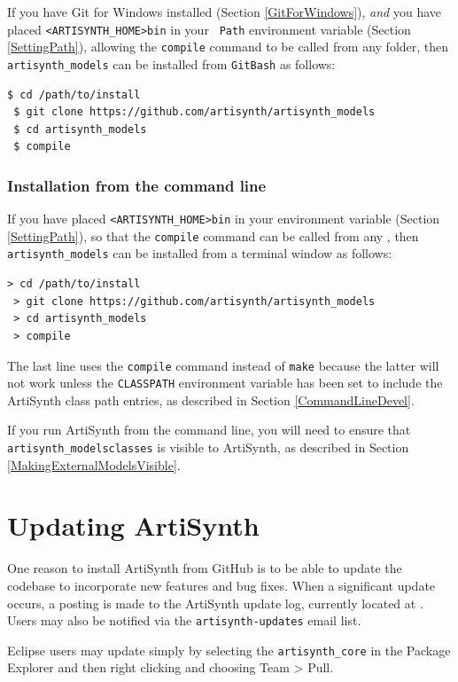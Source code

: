 If you have Git for Windows installed (Section \ref{GitForWindows}),
{\it and} you have placed {\tt <ARTISYNTH\_HOME>\SEP bin} in your {\tt
Path} environment variable (Section \ref{SettingPath}), allowing
the {\tt compile} command to be called from any folder, then {\tt
artisynth\_models} can be installed from {\tt GitBash} as follows:
%
\begin{lstlisting}[]
 $ cd /path/to/install
 $ git clone https://github.com/artisynth/artisynth_models
 $ cd artisynth_models
 $ compile
\end{lstlisting}
%
\else
\subsubsection{Installation from the command line}
If you have placed {\tt <ARTISYNTH\_HOME>\SEP bin} in your \PATH{}
environment variable (Section \ref{SettingPath}), so that the
{\tt compile} command can be called from any \directory{}, then {\tt
artisynth\_models} can be installed from a terminal window as follows:
%
\begin{lstlisting}[]
 > cd /path/to/install
 > git clone https://github.com/artisynth/artisynth_models
 > cd artisynth_models
 > compile
\end{lstlisting}
%
\fi
The last line uses the {\tt compile} command instead of {\tt make}
because the latter will not work unless the {\tt CLASSPATH}
environment variable has been set to include the ArtiSynth class path
entries, as described in Section \ref{CommandLineDevel}.

If you run ArtiSynth from the command line, you will need to ensure
that {\tt artisynth\_models\SEP classes} is visible to ArtiSynth, as
described in Section \ref{MakingExternalModelsVisible}.

\section{Updating ArtiSynth}
\label{UpdatingArtiSynth:sec}

One reason to install ArtiSynth from GitHub is to be able to update
the codebase to incorporate new features and bug fixes.  When a
significant update occurs, a posting is made to the ArtiSynth update
log, currently located at
.
Users may also be notified via the {\tt artisynth-updates} email list.

Eclipse users may update simply by selecting the {\tt artisynth\_core}
in the {\sf Package Explorer} and then right clicking and choosing
{\sf Team > Pull}.

